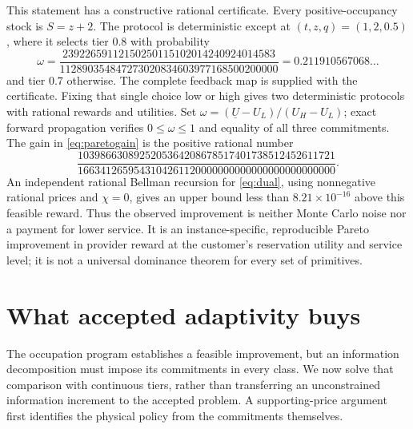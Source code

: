 \documentclass[11pt,letterpaper]{article}
\theoremstyle{definition}
\newcommand{\1}{\mathbf 1}
\begin{document}
This statement has a constructive rational certificate. Every positive-occupancy stock is $S=z+2$. The protocol is deterministic except at $(t,z,q)=(1,2,0.5)$, where it selects tier $0.8$ with probability
\[
 \omega=
 \frac{23922659112150250115102014240924014583}
 {112890354847273020834603977168500200000}
 =0.211910567068\ldots
\]
and tier $0.7$ otherwise. The complete feedback map is supplied with the certificate. Fixing that single choice low or high gives two deterministic protocols with rational rewards and utilities. Set $\omega=(\underline U-U_L)/(U_H-U_L)$; exact forward propagation verifies $0\leq\omega\leq1$ and equality of all three commitments. The gain in \eqref{eq:paretogain} is the positive rational number
\[
 \frac{1039866308925205364208678517401738512452611721}
 {1663412659543104261120000000000000000000000000}.
\]
An independent rational Bellman recursion for \eqref{eq:dual}, using nonnegative rational prices and $\chi=0$, gives an upper bound less than $8.21\times10^{-16}$ above this feasible reward. Thus the observed improvement is neither Monte Carlo noise nor a payment for lower service. It is an instance-specific, reproducible Pareto improvement in provider reward at the customer's reservation utility and service level; it is not a universal dominance theorem for every set of primitives.



\section{What accepted adaptivity buys}\label{sec:accepted-continuous}
The occupation program establishes a feasible improvement, but an information decomposition must impose its commitments in every class. We now solve that comparison with continuous tiers, rather than transferring an unconstrained information increment to the accepted problem. A supporting-price argument first identifies the physical policy from the commitments themselves.
\end{document}
